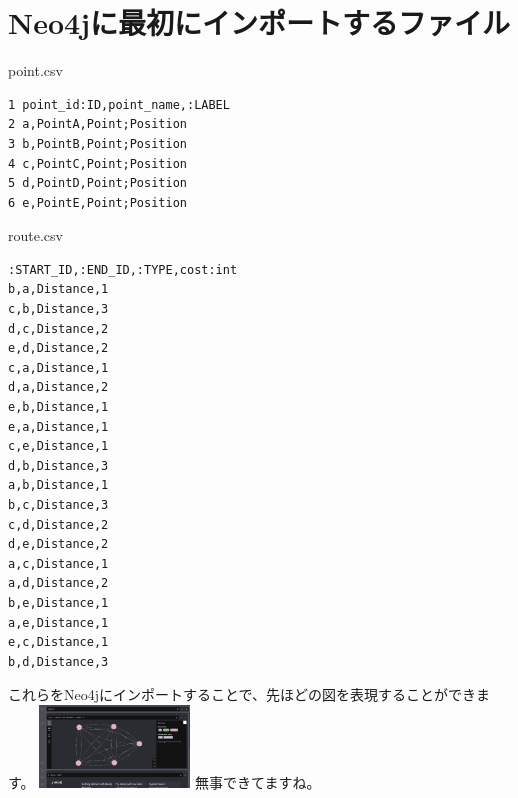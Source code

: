 \section{Neo4jに最初にインポートするファイル}
point.csv
\begin{tcolorbox}[breakable]
    \begin{verbatim}
1 point_id:ID,point_name,:LABEL
2 a,PointA,Point;Position
3 b,PointB,Point;Position
4 c,PointC,Point;Position
5 d,PointD,Point;Position
6 e,PointE,Point;Position
\end{verbatim}
\end{tcolorbox}

route.csv
\begin{tcolorbox}[breakable]
    \begin{verbatim}
:START_ID,:END_ID,:TYPE,cost:int
b,a,Distance,1
c,b,Distance,3
d,c,Distance,2
e,d,Distance,2
c,a,Distance,1
d,a,Distance,2
e,b,Distance,1
e,a,Distance,1
c,e,Distance,1
d,b,Distance,3
a,b,Distance,1
b,c,Distance,3
c,d,Distance,2
d,e,Distance,2
a,c,Distance,1
a,d,Distance,2
b,e,Distance,1
a,e,Distance,1
e,c,Distance,1
b,d,Distance,3
\end{verbatim}
\end{tcolorbox}
これらをNeo4jにインポートすることで、先ほどの図を表現することができます。
\includegraphics[width=4cm]{./image/03-Tech/chap3/neo4j_result.png}
無事できてますね。

